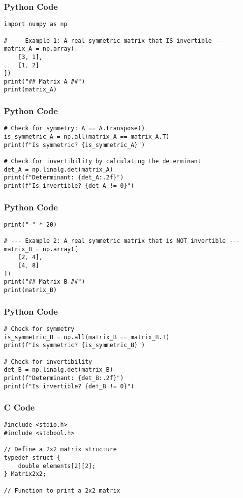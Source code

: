 \documentclass{beamer}
\begin{document}
\begin{frame}[fragile]
\frametitle{Python Code}
\begin{lstlisting}
import numpy as np

# --- Example 1: A real symmetric matrix that IS invertible ---
matrix_A = np.array([
    [3, 1],
    [1, 2]
])
print("## Matrix A ##")
print(matrix_A)
\end{lstlisting}
\end{frame}

\begin{frame}[fragile]
\frametitle{Python Code}
\begin{lstlisting}
# Check for symmetry: A == A.transpose()
is_symmetric_A = np.all(matrix_A == matrix_A.T)
print(f"Is symmetric? {is_symmetric_A}")

# Check for invertibility by calculating the determinant
det_A = np.linalg.det(matrix_A)
print(f"Determinant: {det_A:.2f}")
print(f"Is invertible? {det_A != 0}")
\end{lstlisting}
\end{frame}

\begin{frame}[fragile]
\frametitle{Python Code}
\begin{lstlisting}
print("-" * 20)

# --- Example 2: A real symmetric matrix that is NOT invertible ---
matrix_B = np.array([
    [2, 4],
    [4, 8]
])
print("## Matrix B ##")
print(matrix_B)
\end{lstlisting}
\end{frame}

\begin{frame}[fragile]
\frametitle{Python Code}
\begin{lstlisting}
# Check for symmetry
is_symmetric_B = np.all(matrix_B == matrix_B.T)
print(f"Is symmetric? {is_symmetric_B}")

# Check for invertibility
det_B = np.linalg.det(matrix_B)
print(f"Determinant: {det_B:.2f}")
print(f"Is invertible? {det_B != 0}")
\end{lstlisting}
\end{frame}

\begin{frame}[fragile]
\frametitle{C Code}
\begin{lstlisting}
#include <stdio.h>
#include <stdbool.h>

// Define a 2x2 matrix structure
typedef struct {
    double elements[2][2];
} Matrix2x2;

// Function to print a 2x2 matrix
\end{lstlisting}
\end{frame}
\end{document}
